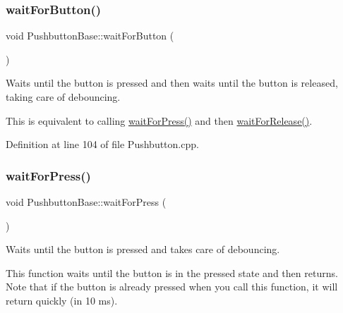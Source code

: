 \mbox{\label{class_pushbutton_base_ab755065c930be0649597220316213e8a}} 
\subsubsection{\texorpdfstring{wait\+For\+Button()}{waitForButton()}}
{\footnotesize\ttfamily void Pushbutton\+Base\+::wait\+For\+Button (\begin{DoxyParamCaption}{ }\end{DoxyParamCaption})\hspace{0.3cm}{\ttfamily [inherited]}}



Waits until the button is pressed and then waits until the button is released, taking care of debouncing. 

This is equivalent to calling \hyperlink{class_pushbutton_base_a2e2787595c82ee0913ecf4c1eea4a2c8}{wait\+For\+Press()} and then \hyperlink{class_pushbutton_base_ae5fff34b3e1ebd62fd02b99edd6bf13a}{wait\+For\+Release()}. 

Definition at line 104 of file Pushbutton.\+cpp.

\mbox{\label{class_pushbutton_base_a2e2787595c82ee0913ecf4c1eea4a2c8}} 
\subsubsection{\texorpdfstring{wait\+For\+Press()}{waitForPress()}}
{\footnotesize\ttfamily void Pushbutton\+Base\+::wait\+For\+Press (\begin{DoxyParamCaption}{ }\end{DoxyParamCaption})\hspace{0.3cm}{\ttfamily [inherited]}}



Waits until the button is pressed and takes care of debouncing. 

This function waits until the button is in the pressed state and then returns. Note that if the button is already pressed when you call this function, it will return quickly (in 10 ms). 

